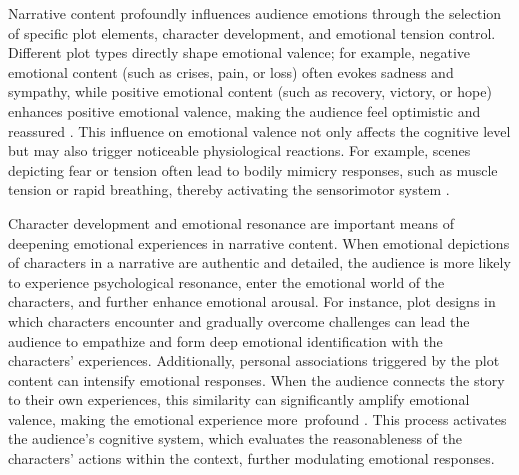 Narrative content profoundly influences audience emotions through the selection of specific plot elements, character development, and emotional tension control. Different plot types directly shape emotional valence; for example, negative emotional content (such as crises, pain, or loss) often evokes sadness and sympathy, while positive emotional content (such as recovery, victory, or hope) enhances positive emotional valence, making the audience feel optimistic and reassured \cite{mar2011emotion, lekkas2022using}. This influence on emotional valence not only affects the cognitive level but may also trigger noticeable physiological reactions. For example, scenes depicting fear or tension often lead to bodily mimicry responses, such as muscle tension or rapid breathing, thereby activating the sensorimotor system \cite{james1884mind, panksepp2012archeology}.

Character development and emotional resonance are important means of deepening emotional experiences in narrative content. When emotional depictions of characters in a narrative are authentic and detailed, the audience is more likely to experience psychological resonance, enter the emotional world of the characters, and further enhance emotional arousal. For instance, plot designs in which characters encounter and gradually overcome challenges can lead the audience to empathize and form deep emotional identification with the characters’ experiences. Additionally, personal associations triggered by the plot content can intensify emotional responses. When the audience connects the story to their own experiences, this similarity can significantly amplify emotional valence, making the emotional experience more~profound \cite{mar2011emotion, nguyen2014affective}. This process activates the audience's cognitive system, which evaluates the reasonableness of the characters' actions within the context, further modulating emotional responses. %

